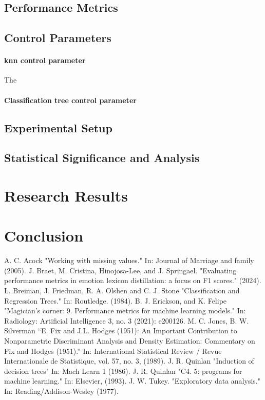 \documentclass[10pt, conference]{IEEEtran}
\begin{document}
\subsection{Performance Metrics}



\subsection{Control Parameters}

\paragraph{\acrshort{knn} control parameter}
The

\paragraph{Classification tree control parameter}

\subsection{Experimental Setup}

\subsection{Statistical Significance and Analysis}

\section{Research Results}
\section{Conclusion}
\begin{thebibliography}{00}
     A. C. Acock "Working with missing values." In: Journal of Marriage and family (2005).
     J. Braet, M. Cristina, Hinojosa-Lee, and J. Springael. "Evaluating performance metrics in emotion lexicon distillation: a focus on F1 scores." (2024).
     L. Breiman, J. Friedman, R. A. Olshen and C. J. Stone "Classification and Regression Trees." In: Routledge.  (1984).
     B. J. Erickson, and K. Felipe "Magician’s corner: 9. Performance metrics for machine learning models." In: Radiology: Artificial Intelligence 3, no. 3 (2021): e200126.
     M. C. Jones, B. W. Silverman “E. Fix and J.L. Hodges (1951): An Important Contribution to Nonparametric Discriminant Analysis and Density Estimation: Commentary on Fix and Hodges (1951).” In: International Statistical Review / Revue Internationale de Statistique, vol. 57, no. 3, (1989).
     J. R. Quinlan "Induction of decision trees" In: Mach Learn 1 (1986).
     J. R. Quinlan "C4. 5: programs for machine learning." In: Elsevier, (1993).
     J. W. Tukey. "Exploratory data analysis." In: Reading/Addison-Wesley (1977).
\end{thebibliography}
\end{document}
